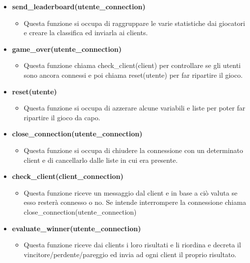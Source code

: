 \begin{itemize}
	\item \textbf{\normalsize send\_leaderboard(utente\_connection)}
	\begin{itemize}
		\item \textsf{\normalsize Questa funzione si occupa di raggruppare le varie statistiche dai giocatori e creare la classifica ed inviarla ai clients.}
	\end{itemize}
	\item \textbf{\normalsize game\_over(utente\_connection)}
	\begin{itemize}
		\item \textsf{\normalsize Questa funzione chiama check\_client(client) per controllare se gli utenti sono ancora connessi e poi chiama reset(utente) per far ripartire il gioco.}
	\end{itemize}
	\item \textbf{\normalsize reset(utente)}
	\begin{itemize}
		\item \textsf{\normalsize Questa funzione si occupa di azzerare alcune variabili e liste per poter far ripartire il gioco da capo.}
	\end{itemize}
	\item \textbf{\normalsize close\_connection(utente\_connection)}
	\begin{itemize}
		\item \textsf{\normalsize Questa funzione si occupa di chiudere la connessione con un determinato client e di cancellarlo dalle liste in cui era presente.}
	\end{itemize}
	\item \textbf{\normalsize check\_client(client\_connection)}
	\begin{itemize}
		\item \textsf{\normalsize Questa funzione riceve un messaggio dal client e in base a ciò valuta se esso resterà connesso o no. Se intende interrompere la connessione chiama close\_connection(utente\_connection)}
	\end{itemize}
	\item \textbf{\normalsize evaluate\_winner(utente\_connection)}
	\begin{itemize}
		\item \textsf{\normalsize Questa funzione riceve dai clients i loro risultati e li riordina e decreta il vincitore/perdente/pareggio ed invia ad ogni client il proprio risultato.}
	\end{itemize}
\end{itemize}

